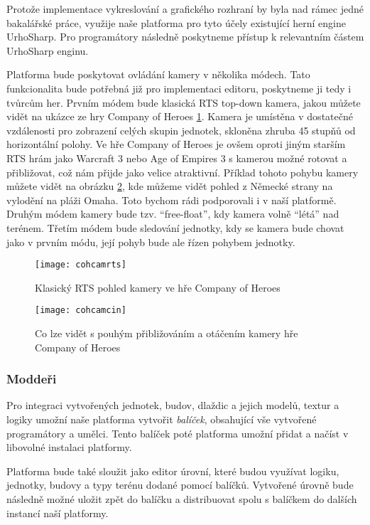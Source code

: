 Protože implementace vykreslování a grafického rozhraní by byla nad rámec jedné bakalářské práce, využije naše platforma pro tyto účely existující herní engine UrhoSharp. Pro programátory následně  poskytneme přístup k relevantním částem UrhoSharp enginu.

Platforma bude poskytovat ovládání kamery v několika módech. Tato funkcionalita bude potřebná již pro implementaci editoru, poskytneme ji tedy i tvůrcům her. Prvním módem bude klasická RTS top-down kamera, jakou můžete vidět na ukázce ze hry Company of Heroes \ref{fig:cohcamrts}. Kamera je umístěna v dostatečné vzdálenosti pro zobrazení celých skupin jednotek, skloněna zhruba 45 stupňů od horizontální polohy.  Ve hře Company of Heroes je ovšem oproti jiným starším RTS hrám jako Warcraft 3 nebo Age of Empires 3 s kamerou možné rotovat a přibližovat, což nám přijde jako velice atraktivní. Příklad tohoto pohybu kamery můžete vidět na obrázku \ref{fig:cohcamcin}, kde můžeme vidět pohled z Německé strany na vylodění na pláži Omaha. Toto bychom rádi podporovali i v naší platformě. Druhým módem kamery bude tzv. ``free-float'', kdy kamera volně ``létá'' nad terénem. Třetím módem bude sledování jednotky, kdy se kamera bude chovat jako v prvním módu, její pohyb bude ale řízen pohybem jednotky.

\begin{figure}[h]	
	\centering
	\texttt{[image: cohcamrts]}
	\caption{Klasický RTS pohled kamery ve hře Company of Heroes}
	\label{fig:cohcamrts}
\end{figure}

\begin{figure}[h]	
	\centering
	\texttt{[image: cohcamcin]}
	\caption{Co lze vidět s pouhým přibližováním a otáčením kamery hře Company of Heroes}
	\label{fig:cohcamcin}
\end{figure}

\subsubsection{Moddeři}

Pro integraci vytvořených jednotek, budov, dlaždic a jejich modelů, textur a logiky umožní naše platforma vytvořit \emph{balíček}, obsahující vše vytvořené programátory a umělci.  Tento balíček poté platforma umožní přidat a načíst v libovolné instalaci platformy.

Platforma bude také sloužit jako editor úrovní, které budou využívat logiku, jednotky, budovy a typy terénu dodané pomocí balíčků. Vytvořené úrovně bude následně možné uložit zpět do balíčku a distribuovat spolu s balíčkem do dalších instancí naší platformy.

